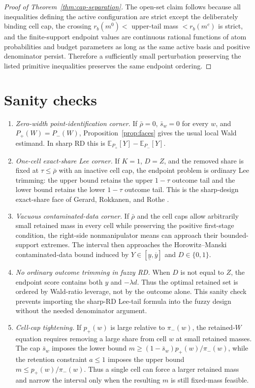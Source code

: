 \documentclass[11pt]{article}
\newcommand{\E}{\mathbb{E}}
\theoremstyle{definition}
\theoremstyle{plain}
\theoremstyle{remark}
\begin{document}
\begin{proof}[Proof of Theorem~\ref{thm:cap-separation}]
The open-set claim follows because all inequalities defining the active configuration are
strict except the deliberately binding cell cap, the crossing
\(r_b(m^0)<\) upper-tail mass \(<r_b(m^c)\) is strict, and the finite-support endpoint
values are continuous rational functions of atom probabilities and budget parameters as
long as the same active basis and positive denominator persist.  Therefore a sufficiently
small perturbation preserving the listed primitive inequalities preserves the same
endpoint ordering.
\end{proof}

\section{Sanity checks}
\begin{enumerate}[leftmargin=*]
  \item \emph{Zero-width point-identification corner.}  If \(\bar\rho=0\),
  \(\bar s_w=0\) for every \(w\), and \(P_+(W)=P_-(W)\), Proposition~\ref{prop:faces}
  gives the usual local Wald estimand.  In sharp RD this is
  \(\E_{P_+}[Y]-\E_{P_-}[Y]\).

  \item \emph{One-cell exact-share Lee corner.}  If \(K=1\), \(D=Z\), and the removed
  share is fixed at \(\tau\le\bar\rho\) with an inactive cell cap, the endpoint problem is
  ordinary Lee trimming: the upper bound retains the upper \(1-\tau\) outcome tail and the
  lower bound retains the lower \(1-\tau\) outcome tail.  This is the sharp-design
  exact-share face of Gerard, Rokkanen, and Rothe \cite{GerardRokkanenRothe2020}.

  \item \emph{Vacuous contaminated-data corner.}  If \(\bar\rho\) and the cell caps allow
  arbitrarily small retained mass in every cell while preserving the positive first-stage
  condition, the right-side nonmanipulator means can approach their bounded-support
  extremes.  The interval then approaches the Horowitz--Manski contaminated-data bound
  induced by \(Y\in[\underline y,\overline y]\) and \(D\in\{0,1\}\).

  \item \emph{No ordinary outcome trimming in fuzzy RD.}  When \(D\) is not equal to \(Z\),
  the endpoint score contains both \(y\) and \(-\lambda d\).  Thus the optimal retained
  set is ordered by Wald-ratio leverage, not by the outcome alone.  This sanity check
  prevents importing the sharp-RD Lee-tail formula into the fuzzy design without the
  needed denominator argument.

  \item \emph{Cell-cap tightening.}  If \(p_+(w)\) is large relative to \(\pi_-(w)\), the
  retained-\(W\) equation requires removing a large share from cell \(w\) at small retained
  masses.  The cap \(\bar s_w\) imposes the lower bound
  \(m\ge (1-\bar s_w)p_+(w)/\pi_-(w)\), while the retention constraint \(a\le1\) imposes
  the upper bound \(m\le p_+(w)/\pi_-(w)\).  Thus a single cell can force a larger retained
  mass and narrow the interval only when the resulting \(m\) is still fixed-mass feasible.
\end{enumerate}
\end{document}
